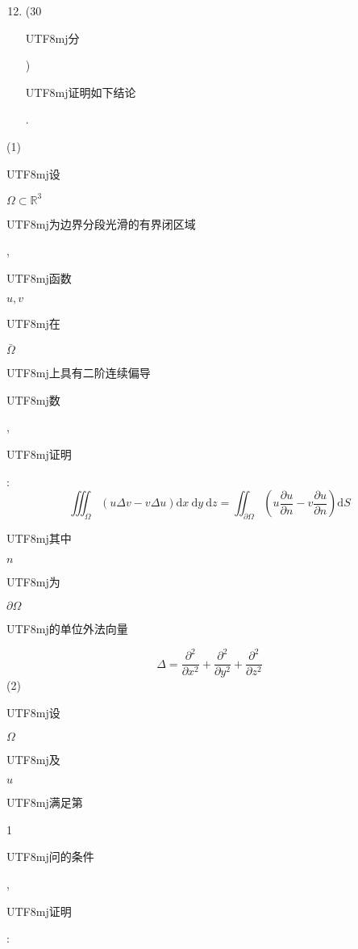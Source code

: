 \documentclass[10pt]{article}
\begin{document}
\begin{enumerate}
  \setcounter{enumi}{11}
  \item (30 \begin{CJK}{UTF8}{mj}分\end{CJK}) \begin{CJK}{UTF8}{mj}证明如下结论\end{CJK}.
\end{enumerate}
(1) \begin{CJK}{UTF8}{mj}设\end{CJK} $\Omega \subset \mathbb{R}^{3}$ \begin{CJK}{UTF8}{mj}为边界分段光滑的有界闭区域\end{CJK}, \begin{CJK}{UTF8}{mj}函数\end{CJK} $u, v$ \begin{CJK}{UTF8}{mj}在\end{CJK} $\bar{\Omega}$ \begin{CJK}{UTF8}{mj}上具有二阶连续偏导\end{CJK} \begin{CJK}{UTF8}{mj}数\end{CJK}, \begin{CJK}{UTF8}{mj}证明\end{CJK}:
$$
\iiint_{\Omega}(u \Delta v-v \Delta u) \mathrm{d} x \mathrm{~d} y \mathrm{~d} z=\iint_{\partial \Omega}\left(u \frac{\partial u}{\partial n}-v \frac{\partial u}{\partial n}\right) \mathrm{d} S
$$
\begin{CJK}{UTF8}{mj}其中\end{CJK} $n$ \begin{CJK}{UTF8}{mj}为\end{CJK} $\partial \Omega$ \begin{CJK}{UTF8}{mj}的单位外法向量\end{CJK}
$$
\Delta=\frac{\partial^{2}}{\partial x^{2}}+\frac{\partial^{2}}{\partial y^{2}}+\frac{\partial^{2}}{\partial z^{2}}
$$
(2) \begin{CJK}{UTF8}{mj}设\end{CJK} $\Omega$ \begin{CJK}{UTF8}{mj}及\end{CJK} $u$ \begin{CJK}{UTF8}{mj}满足第\end{CJK} 1 \begin{CJK}{UTF8}{mj}问的条件\end{CJK}, \begin{CJK}{UTF8}{mj}证明\end{CJK}:
\end{document}
